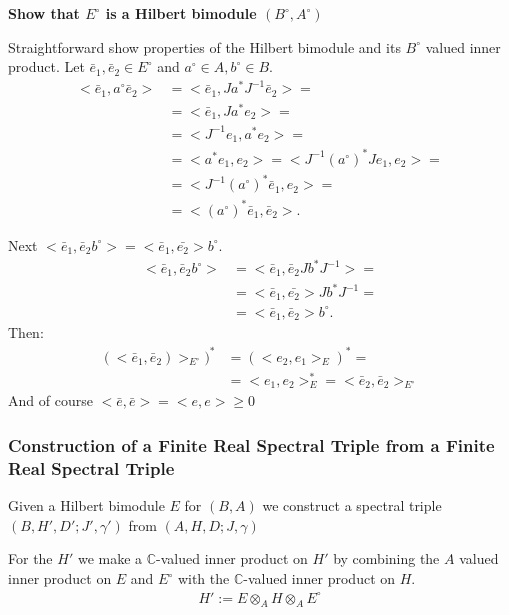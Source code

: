 \documentclass[a4paper]{article}
\newcounter{exercise}
\newenvironment{MyExercise}%
{\begin{mdframed}[style=exercisestyle]}{\end{mdframed}}
\theoremstyle{definition}
\theoremstyle{definition}
\theoremstyle{definition}
\theoremstyle{theorem}
\theoremstyle{theorem}
\begin{document}
\begin{MyExercise}
    \textbf{Show that $E^\circ$ is a Hilbert bimodule $(B^{\circ}, A^{\circ})$
    }\newline


    Straightforward show properties of the Hilbert bimodule and its $B^{\circ}$
    valued inner product. Let $\bar{e}_1, \bar{e}_2 \in E^{\circ}$ and $a^\circ \in A,
    b^\circ \in B$. \\
    \begin{align}
        <\bar{e}_1, a^\circ \bar{e}_2> &= <\bar{e}_1, Ja^*J^{-1} \bar{e}_2>=\\
        &= <\bar{e}_1 , J a^* e_2> = \\
        &= <J^{-1} e_1, a^* e_2> =\\
        & = <a^* e_1, e_2>= <J^{-1}(a^\circ)^* J e_1, e_2> = \\
        & = <J^{-1} (a^\circ)^* \bar{e}_1, e_2> =\\
        & = <(a^\circ)^* \bar{e}_1 , \bar{e}_2>.
    \end{align}

    Next $<\bar{e}_1, \bar{e}_2 b^\circ> = <\bar{e}_1, \bar{e_2}> b^\circ$.
    \begin{align}
        <\bar{e}_1, \bar{e}_2 b^\circ>  &= <\bar{e}_1, \bar{e}_2 Jb^*J^{-1}> =\\
        &= <\bar{e}_1, \bar{e_2}> Jb^*J^{-1} = \\
        &= <\bar{e}_1, \bar{e}_2> b^\circ.
    \end{align}
    Then:
    \begin{align}
        (<\bar{e}_1, \bar{e}_2)>_{E^\circ})^* &= (<e_2, e_1>_E)^* =\\
        &= <e_1, e_2>_E^* = <\bar{e}_2, \bar{e}_2>_{E^\circ}
    \end{align}
    And of course $<\bar{e}, \bar{e}> = <e, e> \geq 0$
\end{MyExercise}

\subsubsection{Construction of a Finite Real Spectral Triple from a Finite
Real Spectral Triple}
Given a Hilbert bimodule $E$ for $(B, A)$ we construct a spectral triple
$(B, H', D'; J', \gamma ')$ from $(A, H, D; J, \gamma)$

For the $H'$ we make a $\mathbb{C}$-valued inner product on $H'$ by combining
the $A$ valued inner product on $E$ and $E^\circ$ with the
$\mathbb{C}$-valued inner product on $H$.
\begin{align}
    H' := E\otimes _A H \otimes _A E^\circ
\end{align}
\end{document}
